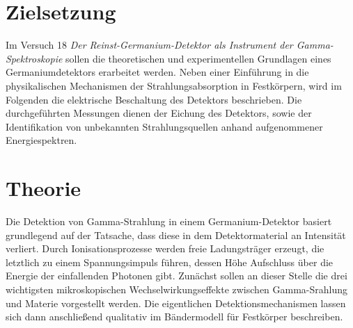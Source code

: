 \setcounter{page}{1}
\section*{Zielsetzung}
Im Versuch 18 \textit{Der Reinst-Germanium-Detektor als
Instrument der Gamma-Spektroskopie} sollen die theoretischen und experimentellen Grundlagen eines
Germaniumdetektors erarbeitet werden. Neben einer Einführung in die physikalischen Mechanismen der
Strahlungsabsorption in Festkörpern, wird im Folgenden die elektrische Beschaltung des Detektors beschrieben.
Die durchgeführten Messungen dienen der Eichung des Detektors, sowie der Identifikation von unbekannten
Strahlungsquellen anhand aufgenommener Energiespektren.

\section{Theorie}
Die Detektion von Gamma-Strahlung in einem Germanium-Detektor basiert grundlegend auf der Tatsache, dass diese in dem
Detektormaterial an Intensität verliert. Durch Ionisationsprozesse werden freie Ladungsträger erzeugt, die letztlich
zu einem Spannungsimpuls führen, dessen Höhe Aufschluss über die Energie der einfallenden Photonen gibt.
Zunächst sollen an dieser Stelle die drei wichtigsten mikroskopischen Wechselwirkungseffekte zwischen Gamma-Srahlung und
Materie vorgestellt werden. Die eigentlichen Detektionsmechanismen lassen sich dann anschließend qualitativ im
Bändermodell für Festkörper beschreiben.

